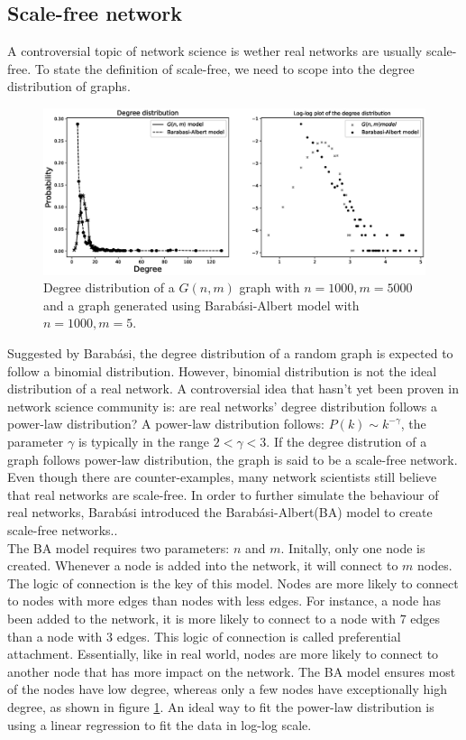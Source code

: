 \documentclass[12pt]{article}
\begin{document}
\subsection{Scale-free network}
A controversial topic of network science is wether real networks are usually scale-free\cite{broido_clauset_2019}\cite{albert1999diameter}. To state the definition of scale-free, we need to scope into the degree distribution of graphs.\\

\begin{figure}[ht]
    \centering
    \includegraphics[width=\textwidth]{degree_distribution.eps}
    \centering
    \caption{Degree distribution of a $G(n,m)$ graph with $n=1000,m=5000$ and a graph generated using Barabási-Albert model with $n=1000,m=5$.}
    \label{fig:degree_dist}
\end{figure}
\noindent
Suggested by Barabási\cite{barabási2016network}, the degree distribution of a random graph is expected to follow a binomial distribution. However, binomial distribution is not the ideal distribution of a real network. A controversial idea that hasn't yet been proven in network science community is: are real networks' degree distribution follows a power-law distribution? A power-law distribution follows: $P(k) \sim k^{-\gamma }$, the parameter $\gamma$ is typically in the range $2<\gamma<3$. If the degree distrution of a graph follows power-law distribution, the graph is said to be a scale-free network. Even though there are counter-examples, many network scientists still believe that real networks are scale-free. In order to further simulate the behaviour of real networks, Barabási introduced the Barabási-Albert(BA) model to create scale-free networks.\cite{barabási2016network}.\\
The BA model requires two parameters: $n$ and $m$. Initally, only one node is created. Whenever a node is added into the network, it will connect to $m$ nodes. The logic of connection is the key of this model. Nodes are more likely to connect to nodes with more edges than nodes with less edges. For instance, a node has been added to the network, it is more likely to connect to a node with 7 edges than a node with 3 edges. This logic of connection is called preferential attachment. Essentially, like in real world, nodes are more likely to connect to another node that has more impact on the network.\cite{pa_test} The BA model ensures most of the nodes have low degree, whereas only a few nodes have exceptionally high degree, as shown in figure \ref{fig:degree_dist}. An ideal way to fit the power-law distribution is using a linear regression to fit the data in log-log scale.
\end{document}
